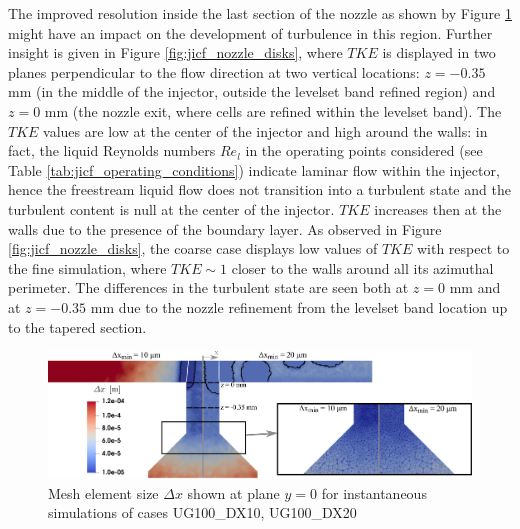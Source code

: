The improved resolution inside the last section of the nozzle as shown by Figure \ref{fig:jicf_injector_resolution_with_mesh} might have an impact on the development of turbulence in this region. Further insight is given in Figure \ref{fig:jicf_nozzle_disks}, where $TKE$ is displayed in two planes perpendicular to the flow direction at two vertical locations: $z = -0.35$ mm (in the middle of the injector, outside the levelset band refined region) and $z = 0$ mm (the nozzle exit, where cells are refined within the levelset band). The $TKE$ values are low at the center of the injector and high around the walls: in fact, the liquid Reynolds numbers $Re_l$ in the operating points considered (see Table \ref{tab:jicf_operating_conditions}) indicate laminar flow within the injector, hence the freestream liquid flow does not transition into a turbulent state and the turbulent content is null at the center of the injector. $TKE$ increases then at the walls due to the presence of the boundary layer. As observed in Figure \ref{fig:jicf_nozzle_disks}, the coarse case displays low values of $TKE$ with respect to the fine simulation, where $TKE \sim 1$ closer to the walls around all its azimuthal perimeter. The differences in the turbulent state are seen both at $z = 0$ mm and at $z = -0.35$ mm due to the nozzle refinement from the levelset band location up to the tapered section.


\begin{figure}[ht]
	\centering
   \includegraphics[scale=0.28]{./part2_developments/figures_ch5_resolved_JICF/instabilities_resolution/injector_resolution_with_mesh}
   \caption{Mesh element size $\Delta x$ shown at plane $y = 0$ for instantaneous simulations of cases UG100\_DX10, UG100\_DX20}
   \label{fig:jicf_injector_resolution_with_mesh}
\end{figure}

\clearpage

